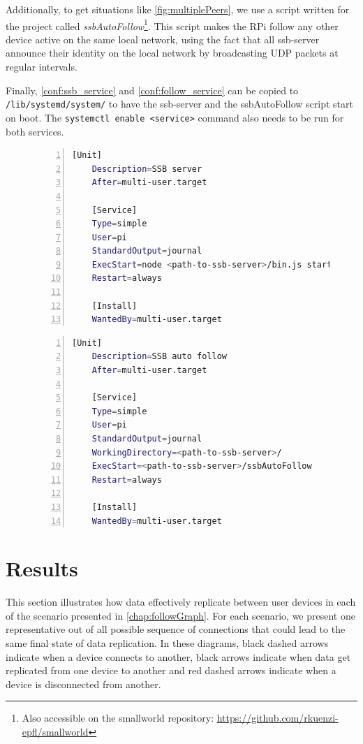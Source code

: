 \documentclass[a4paper,11pt,oneside]{report}
\begin{document}
Additionally, to get situations like \autoref{fig:multiplePeers}, we use a script written for the project called \emph{ssbAutoFollow}\footnote{Also accessible on the smallworld repository: \url{https://github.com/rkuenzi-epfl/smallworld}}. This script makes the RPi follow any other device active on the same local network, using the fact that all ssb-server announce their identity on the local network by broadcasting UDP packets at regular intervals.

Finally, \autoref{conf:ssb_service} and \autoref{conf:follow_service} can be copied to \verb|/lib/systemd/system/| to have the ssb-server and the ssbAutoFollow script start on boot. The \verb|systemctl enable <service>| command also needs to be run for both services.


\begin{figure}
\begin{lstlisting}[language=bash, label=conf:ssb_service, caption=Service file for ssb-server, numbers=left]
    [Unit]
    Description=SSB server
    After=multi-user.target

    [Service]
    Type=simple
    User=pi
    StandardOutput=journal
    ExecStart=node <path-to-ssb-server>/bin.js start
    Restart=always

    [Install]
    WantedBy=multi-user.target
\end{lstlisting}
\end{figure}

\begin{figure}
\begin{lstlisting}[language=bash, label=conf:follow_service, caption=Service file for ssbAutoFollow, numbers=left]
    [Unit]
    Description=SSB auto follow
    After=multi-user.target

    [Service]
    Type=simple
    User=pi
    StandardOutput=journal
    WorkingDirectory=<path-to-ssb-server>/
    ExecStart=<path-to-ssb-server>/ssbAutoFollow
    Restart=always

    [Install]
    WantedBy=multi-user.target
\end{lstlisting}
\end{figure}


\section{Results}

This section illustrates how data effectively replicate between user devices in each of the scenario presented in \autoref{chap:followGraph}. For each scenario, we present one representative out of all possible sequence of connections that could lead to the same final state of data replication. In these diagrams, black dashed arrows indicate when a device connects to another, black arrows indicate when data get replicated from one device to another and red dashed arrows indicate when a device is disconnected from another.
\end{document}
